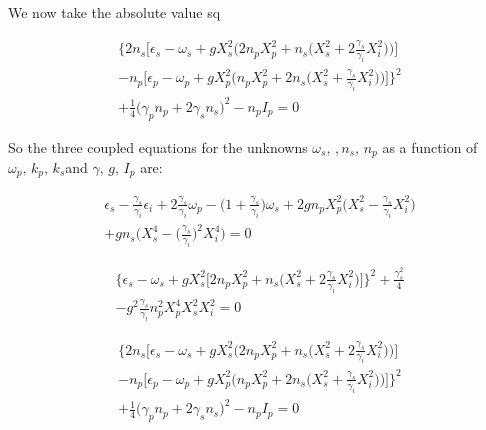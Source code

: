 \documentclass[a4paper,prb,10pt,aps,twocolumn]{revtex4-1}
\begin{document}
We now take the absolute value sq

\begin{multline}
  \label{eq:34}
\Bigg\{ 2n_{s}\Bigg[\epsilon_{s}-\omega_{s}+gX_{s}^{2}\Bigg(2n_{p}X_{p}^{2}+n_{s}\Bigg(X_{s}^{2}+2\frac{\gamma_{s}}{\gamma_{i}}X_{i}^{2}\Bigg)\Bigg)\Bigg]\\
-n_{p}\Bigg[\epsilon_{p}-\omega_{p}+gX_{p}^{2}\Bigg(n_{p}X_{p}^{2}+2n_{s}\Bigg(X_{s}^{2}+\frac{\gamma_{s}}{\gamma_{i}}X_{i}^{2}\Bigg)\Bigg)\Bigg]\Bigg\} ^{2}\\
+\frac{1}{4}\Bigg(\gamma_{p}n_{p}+2\gamma_{s}n_{s}\Bigg)^{2}-n_{p}I_{p}=0  
\end{multline}


So the three coupled equations for the unknowns $\omega_{s},\,,n_{s},\, n_{p}$
as a function of $\omega_{p},\, k_{p},\, k_{s}$and $\gamma,\, g,\, I_{p}$
are:

\begin{multline}
  \label{eq:35}
\epsilon_{s}-\frac{\gamma_{s}}{\gamma_{i}}\epsilon_{i}+2\frac{\gamma_{s}}{\gamma_{i}}\omega_{p}-\Bigg(1+\frac{\gamma_{s}}{\gamma_{i}}\Bigg)\omega_{s}+2gn_{p}X_{p}^{2}\Bigg(X_{s}^{2}-\frac{\gamma_{s}}{\gamma_{i}}X_{i}^{2}\Bigg)\\
+gn_{s}\Bigg(X_{s}^{4}-\Bigg(\frac{\gamma_{s}}{\gamma_{i}}\Bigg)^{2}X_{i}^{4}\Bigg)=0  
\end{multline}

\begin{multline}
  \label{eq:36}
\Bigg\{ \epsilon_{s}-\omega_{s}+gX_{s}^{2}\Bigg[2n_{p}X_{p}^{2}+n_{s}\Bigg(X_{s}^{2}+2\frac{\gamma_{s}}{\gamma_{i}}X_{i}^{2}\Bigg)\Bigg]\Bigg\} ^{2}+\frac{\gamma_{s}^{2}}{4}\\
-g^{2}\frac{\gamma_{s}}{\gamma_{i}}n_{p}^{2}X_{p}^{4}X_{s}^{2}X_{i}^{2}=0  
\end{multline}

\begin{multline}
  \label{eq:37}
\Bigg\{ 2n_{s}\Bigg[\epsilon_{s}-\omega_{s}+gX_{s}^{2}\Bigg(2n_{p}X_{p}^{2}+n_{s}\Bigg(X_{s}^{2}+2\frac{\gamma_{s}}{\gamma_{i}}X_{i}^{2}\Bigg)\Bigg)\Bigg]\\
-n_{p}\Bigg[\epsilon_{p}-\omega_{p}+gX_{p}^{2}\Bigg(n_{p}X_{p}^{2}+2n_{s}\Bigg(X_{s}^{2}+\frac{\gamma_{s}}{\gamma_{i}}X_{i}^{2}\Bigg)\Bigg)\Bigg]\Bigg\} ^{2}\\
+\frac{1}{4}\Bigg(\gamma_{p}n_{p}+2\gamma_{s}n_{s}\Bigg)^{2}-n_{p}I_{p}=0  
\end{multline}
\end{document}
